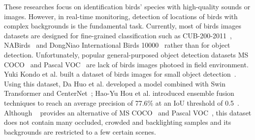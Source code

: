 These researches focus on identification birds' species with 
high-quality sounds or images. However, in real-time monitoring, 
detection of locations of birds with complex backgrounds is the 
fundamental task. Currently, most of birds images datasets 
are designed for fine-grained classification such as CUB-200-2011~\cite{dataset1}, NABirds~\cite{dataset2} and DongNiao International Birds 10000~\cite{dataset3}
rather than for object detection. Unfortunately, 
popular general-purposed object detection datasets MS COCO~\cite{datasetcoco} and Pascal VOC~\cite{datasetvoc} 
are lack of birds images photoed in field environment.
Yuki Kondo et al. built a dataset of birds images for small object detection~\cite{datasetmva}.
Using this dataset, Da Huo et al. developed a model 
combined with Swin Transformer and CenterNet~;
Hao-Yu Hou et al. introduced ensemble fusion techniques to reach 
an average precision of 77.6\% at an IoU threshold of 0.5~\cite{Swint,centernet,mva1,mva2}.
Although ~\cite{datasetmva} provides an alternative of MS COCO~\cite{datasetcoco} and Pascal VOC~\cite{datasetvoc},
this dataset does not contain many occluded, crowded and backlighting 
samples and its backgrounds are restricted to a few certain scenes.

